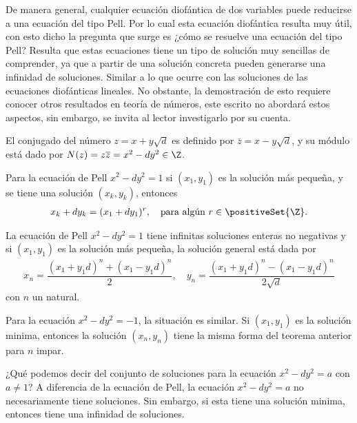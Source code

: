 De manera general, cualquier ecuación diofántica de dos variables puede reducirse a una ecuación del tipo Pell.
Por lo cual esta ecuación diofántica resulta muy útil, con esto dicho la pregunta que surge es ¿cómo se resuelve una ecuación del tipo Pell?
Resulta que estas ecuaciones tiene un tipo de solución muy sencillas de comprender, ya que a partir de una solución concreta pueden generarse una infinidad de soluciones.
Similar a lo que ocurre con las soluciones de las ecuaciones diofánticas lineales.
No obstante, la demostración de esto requiere conocer otros resultados en teoría de números, este escrito no abordará estos aspectos, sin embargo, se invita al lector investigarlo por su cuenta.

\begin{definition.box}{}{}
    El conjugado del número $z = x + y\sqrt{d}$ es definido por $\overline{z} = x - y \sqrt{d}$, y su módulo está dado por $N(z) = z \overline{z} = x^2 - dy^2 \in \Z$.
\end{definition.box}

\begin{theorem.box}{}{}
    Para la ecuación de Pell $x^2 - dy^2 = 1$ si $(x_1, y_1)$ es la solución más pequeña, y se tiene una solución $(x_k, y_k)$, entonces
    \begin{align*}
        x_k + d y_k = (x_1 + dy_1)^r, \quad \text{para algún}\ r\in \positiveSet{\Z}.
    \end{align*}
\end{theorem.box}

\begin{theorem.box}{}{}
    La ecuación de Pell $x^2 - dy^2 = 1$ tiene infinitas soluciones enteras no negativas y si $(x_1, y_1)$ es la solución más pequeña,
    la solución general está dada por
    \begin{align*}
        x_n = \dfrac{(x_1 + y_1 d)^n + (x_1 - y_1 d)^n}{2}, \quad
        y_n = \dfrac{(x_1 + y_1 d)^n - (x_1 - y_1 d)^n}{2\sqrt{d}}
    \end{align*}
    con $n$ un natural.
\end{theorem.box}

Para la ecuación $x^2 - dy^2 = -1$, la situación es similar.
Si $(x_1, y_1)$ es la solución minima, entonces la solución $(x_n, y_n)$ tiene la misma forma del teorema anterior para $n$ impar.

¿Qué podemos decir del conjunto de soluciones para la ecuación $x^2 - dy^2 = a$ con $a \neq 1$?
A diferencia de la ecuación de Pell, la ecuación $x^2 - dy^2 = a$ no necesariamente tiene soluciones.
Sin embargo, si esta tiene una solución minima, entonces tiene una infinidad de soluciones.

